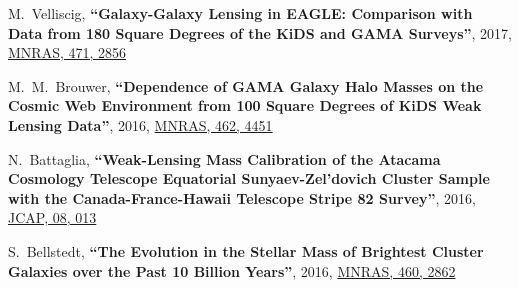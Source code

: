 \documentclass{article}
\def\myself{\textbf{\color{red} C.~Sif\'on}}
\def\jcap{JCAP}
\def\mnras{MNRAS}
\newcommand{\paper}[1]{\textbf{``#1''}}
\begin{document}
\begin{etaremune}
\item
M.~Velliscig, 
\paper{Galaxy-Galaxy Lensing in EAGLE: Comparison with Data from 180 Square
Degrees of the KiDS and GAMA Surveys},
2017, \href{http://adsabs.harvard.edu/abs/2017MNRAS.471.2856V}{\mnras, 471, 2856}

\item
M.~M.~Brouwer, 
\paper{Dependence of GAMA Galaxy Halo Masses on the Cosmic Web Environment from 
100 Square Degrees of KiDS Weak Lensing Data},
2016, \href{http://adsabs.harvard.edu/abs/2016MNRAS.462.4451B}{\mnras, 462, 4451}

\item
N.~Battaglia, 
\paper{Weak-Lensing Mass Calibration of the Atacama Cosmology Telescope Equatorial 
Sunyaev-Zel'dovich Cluster Sample with the Canada-France-Hawaii Telescope Stripe 82 Survey},
2016, \href{http://adsabs.harvard.edu/abs/2016JCAP...08..013B}{\jcap, 08, 013}

\item
S.~Bellstedt, 
\paper{The Evolution in the Stellar Mass of Brightest Cluster Galaxies over the 
Past 10 Billion Years},
2016, \href{http://adsabs.harvard.edu/abs/2016MNRAS.460.2862B}{\mnras, 460, 2862}


\end{etaremune}
\end{document}
